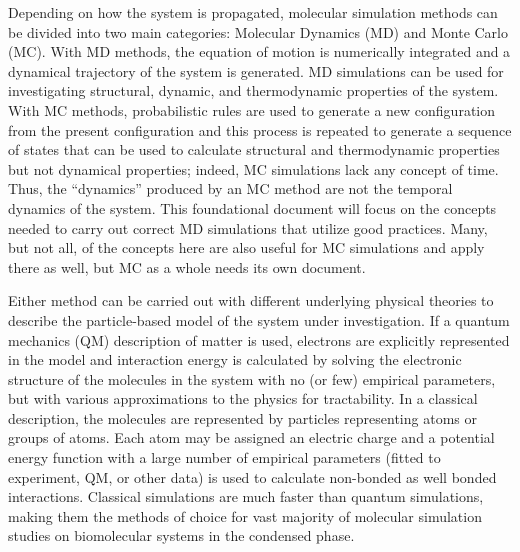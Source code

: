 \documentclass[9pt,bestpractices]{livecoms}
\begin{document}
Depending on how the system is propagated, molecular simulation methods can be divided into two main categories: Molecular Dynamics (MD) and Monte Carlo (MC).
With MD methods, the equation of motion is numerically integrated and a dynamical trajectory of the system is generated. 
MD simulations can be used for investigating structural, dynamic, and thermodynamic properties of the system.
With MC methods, probabilistic rules are used to generate a new configuration from the present configuration and this process is repeated to generate a sequence of states that can be used to calculate structural and thermodynamic properties but not dynamical properties; indeed, MC simulations lack any concept of time. 
Thus, the ``dynamics'' produced by an MC method are not the temporal dynamics of the system. 
This foundational document will focus on the concepts needed to carry out correct MD simulations that utilize good practices. 
Many, but not all, of the concepts here are also useful for MC simulations and apply there as well, but MC as a whole needs its own document.

Either method can be carried out with different underlying physical theories to describe the particle-based model of the system under investigation.
If a quantum mechanics (QM) description of matter is used, electrons are explicitly represented in the model and interaction energy is calculated by solving the electronic structure of the molecules in the system with no (or few) empirical parameters, but with various approximations to the physics for tractability. 
In a classical description, the molecules are represented by particles representing atoms or groups of atoms.  Each atom may be assigned an electric charge and a potential energy function with a large number of empirical parameters (fitted to experiment, QM, or other data)  is used to calculate non-bonded as well bonded interactions.
Classical simulations are much faster than quantum simulations, making them the methods of choice for vast majority of molecular simulation studies on biomolecular systems in the condensed phase.
\end{document}
